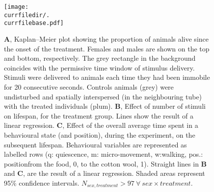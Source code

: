 \begin{figure}[h!]
	\centering   
	\texttt{[image: \\currfiledir/.\\currfilebase.pdf]}
	\caption[Prolonged sleep deprivation is not lethal]{
		\textbf{A}, Kaplan–Meier plot showing the proportion of animals alive since the onset of the treatment.
		Females and males are shown on the top and bottom, respectively.
		The grey rectangle in the background coincides with the permissive time window of stimulus delivery.
		Stimuli were delivered to animals each time they had been immobile for 20 consecutive seconds. %
		Controls animals (grey) were undisturbed and spatially interspersed (in the neighbouring tube) with the treated individuals (plum).
		\textbf{B}, Effect of number of stimuli on lifespan, for the treatment group. Lines show the result of a linear regression.
		\textbf{C}, Effect of the overall average time spent in a behavioural state (and position), during the experiment, on the subsequent lifespan. 
		Behavioural variables are represented as labelled rows (q: quiescence, m: micro-movement, w:walking, pos.: position\emd{}from the food, 0, to the cotton wool, 1).
		Straight lines in \textbf{B} and \textbf{C}, are the result of a linear regression.
		Shaded areas represent 95\% confidence intervals.
		$N_{sex,treatment} > 97~\forall~sex \times treatment$.
		\label{fig:\currfilebase}
	}
\end{figure}
